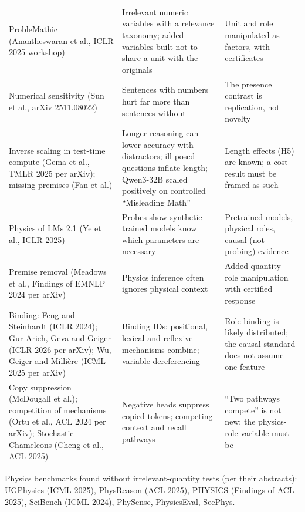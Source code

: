 \documentclass[10pt,a4paper]{article}
\begin{document}
\begin{center}
\begin{longtable}{@{}P{4.0cm}P{5.4cm}P{6.4cm}@{}}
ProbleMathic (Anantheswaran et al., ICLR 2025 workshop) & Irrelevant numeric variables with a relevance taxonomy; added variables built not to share a unit with the originals & Unit and role manipulated as factors, with certificates \\
Numerical sensitivity (Sun et al., arXiv 2511.08022) & Sentences with numbers hurt far more than sentences without & The presence contrast is replication, not novelty \\
Inverse scaling in test-time compute (Gema et al., TMLR 2025 per arXiv); missing premises (Fan et al.) & Longer reasoning can lower accuracy with distractors; ill-posed questions inflate length; Qwen3-32B scaled positively on controlled ``Misleading Math'' & Length effects (H5) are known; a cost result must be framed as such \\
Physics of LMs 2.1 (Ye et al., ICLR 2025) & Probes show synthetic-trained models know which parameters are necessary & Pretrained models, physical roles, causal (not probing) evidence \\
Premise removal (Meadows et al., Findings of EMNLP 2024 per arXiv) & Physics inference often ignores physical context & Added-quantity role manipulation with certified response \\
Binding: Feng and Steinhardt (ICLR 2024); Gur-Arieh, Geva and Geiger (ICLR 2026 per arXiv); Wu, Geiger and Milli\`ere (ICML 2025 per arXiv) & Binding IDs; positional, lexical and reflexive mechanisms combine; variable dereferencing & Role binding is likely distributed; the causal standard does not assume one feature \\
Copy suppression (McDougall et al.); competition of mechanisms (Ortu et al., ACL 2024 per arXiv); Stochastic Chameleons (Cheng et al., ACL 2025) & Negative heads suppress copied tokens; competing context and recall pathways & ``Two pathways compete'' is not new; the physics-role variable must be \\
\bottomrule
\end{longtable}
\end{center}

Physics benchmarks found without irrelevant-quantity tests (per their abstracts): UGPhysics (ICML 2025), PhysReason
(ACL 2025), PHYSICS (Findings of ACL 2025), SciBench (ICML 2024), PhySense, PhysicsEval, SeePhys.
\end{document}

